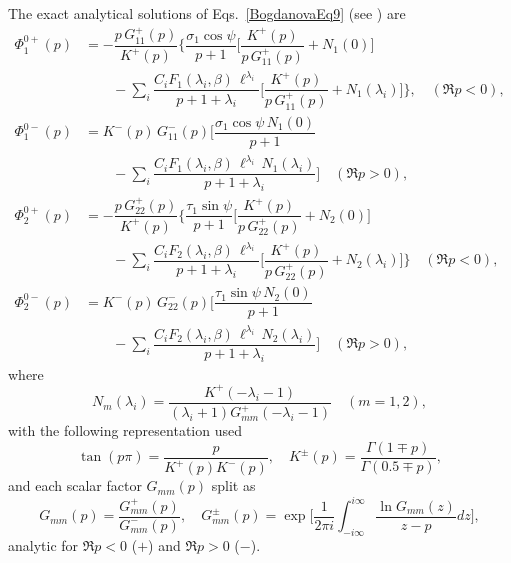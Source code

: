 The exact analytical solutions of Eqs.~\eqref{BogdanovaEq9} (see \cite{Bogdanova12, Bogdanova13}) are  
\begin{equation}\label{BogdanovaEq10}
	\begin{array}{ll}
		\Phi_{1}^{0+}(p)
		&= -\dfrac{p\,G_{11}^{+}(p)}{K^{+}(p)}
		\biggl\{
		\dfrac{\sigma_{1}\cos\psi}{p+1}
		\biggl[\dfrac{K^{+}(p)}{p\,G_{11}^{+}(p)} + N_{1}(0)\biggr]
		\\
		&\qquad-\displaystyle\sum_{i}
		\dfrac{C_{i}F_{1}(\lambda_{i},\beta)\,\ell^{\lambda_{i}}}{p+1+\lambda_{i}}
		\biggl[\dfrac{K^{+}(p)}{p\,G_{11}^{+}(p)} + N_{1}(\lambda_{i})\biggr]
		\biggr\}, \quad (\Re p<0),\\[6pt]
		\Phi_{1}^{0-}(p)
		&= K^{-}(p)\,G_{11}^{-}(p)
		\biggl[
		\dfrac{\sigma_{1}\cos\psi\,N_{1}(0)}{p+1}
		\\
		&\qquad-\displaystyle\sum_{i}
		\dfrac{C_{i}F_{1}(\lambda_{i},\beta)\,\ell^{\lambda_{i}}\,N_{1}(\lambda_{i})}{p+1+\lambda_{i}}
		\biggr]\quad (\Re p>0),\\[10pt]
		\Phi_{2}^{0+}(p)
		&= -\dfrac{p\,G_{22}^{+}(p)}{K^{+}(p)}
		\biggl\{
		\dfrac{\tau_{1}\sin\psi}{p+1}
		\biggl[\dfrac{K^{+}(p)}{p\,G_{22}^{+}(p)} + N_{2}(0)\biggr]
		\\
		&\qquad-\displaystyle\sum_{i}
		\dfrac{C_{i}F_{2}(\lambda_{i},\beta)\,\ell^{\lambda_{i}}}{p+1+\lambda_{i}}
		\biggl[\dfrac{K^{+}(p)}{p\,G_{22}^{+}(p)} + N_{2}(\lambda_{i})\biggr]
		\biggr\}\quad (\Re p<0),\\[6pt]
		\Phi_{2}^{0-}(p)
		&= K^{-}(p)\,G_{22}^{-}(p)
		\biggl[
		\dfrac{\tau_{1}\sin\psi\,N_{2}(0)}{p+1}
		\\
		&\qquad	-\displaystyle\sum_{i}
		\dfrac{C_{i}F_{2}(\lambda_{i},\beta)\,\ell^{\lambda_{i}}\,N_{2}(\lambda_{i})}{p+1+\lambda_{i}}
		\biggr]\quad (\Re p>0),
	\end{array}
\end{equation}
where
\[
N_{m}(\lambda_{i})
= \dfrac{K^{+}(-\lambda_{i}-1)}
{(\lambda_{i}+1) G_{mm}^{+}(-\lambda_{i}-1)}
\quad (m=1,2),
\]
\noindent with the following representation used  
\begin{equation}\label{BogdanovaEq11}
\tan(p\pi)
= \dfrac{p}{K^{+}(p)K^{-}(p)}, 
\quad
K^{\pm}(p)
= \dfrac{\Gamma(1\mp p)}{\Gamma(0.5\mp p)},
\end{equation}
and each scalar factor $G_{mm}(p)$ split as \cite{Bogdanova32}
\begin{equation}\label{BogdanovaEq12}
G_{mm}(p)
= \frac{G_{mm}^{+}(p)}{G_{mm}^{-}(p)},
\quad
G_{mm}^{\pm}(p)
= \exp\biggl[\frac{1}{2\pi i}
\int_{-i\infty}^{i\infty} \frac{\ln G_{mm}(z)}{ z-p } dz
\biggr],
\end{equation}
analytic for $\Re p<0$ ($+$) and $\Re p>0$ ($-$).  

